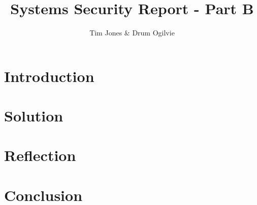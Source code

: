\documentclass[notitlepage]{article}
\title{Systems Security Report - Part B}
\author{Tim Jones \& Drum Ogilvie}
\begin{document}
\maketitle

\section{Introduction}



\section{Solution}



\section{Reflection}



\section{Conclusion}


\clearpage
{}

\end{document}
